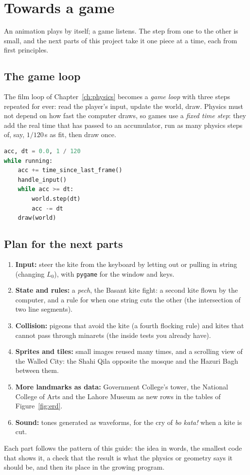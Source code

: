 \chapter{Towards a game}\label{ch:next}

An animation plays by itself; a game listens. The step from one to the other is small, and the next parts of this project take it one piece at a time, each from first principles.

\section{The game loop}
The film loop of Chapter~\ref{ch:physics} becomes a \emph{game loop} with three steps repeated for ever: read the player's input, update the world, draw. Physics must not depend on how fast the computer draws, so games use a \emph{fixed time step}: they add the real time that has passed to an accumulator, run as many physics steps of, say, $1/120$\,s as fit, then draw once.
\begin{lstlisting}[language=Python]
acc, dt = 0.0, 1 / 120
while running:
    acc += time_since_last_frame()
    handle_input()
    while acc >= dt:
        world.step(dt)
        acc -= dt
    draw(world)
\end{lstlisting}

\section{Plan for the next parts}
\begin{enumerate}
\item \textbf{Input:} steer the kite from the keyboard by letting out or pulling in string (changing $L_0$), with \texttt{pygame} for the window and keys.
\item \textbf{State and rules:} a \emph{pech}, the Basant kite fight: a second kite flown by the computer, and a rule for when one string cuts the other (the intersection of two line segments).
\item \textbf{Collision:} pigeons that avoid the kite (a fourth flocking rule) and kites that cannot pass through minarets (the inside tests you already have).
\item \textbf{Sprites and tiles:} small images reused many times, and a scrolling view of the Walled City: the Shahi Qila opposite the mosque and the Hazuri Bagh between them.
\item \textbf{More landmarks as data:} Government College's tower, the National College of Arts and the Lahore Museum as new rows in the tables of Figure~\ref{fig:erd}.
\item \textbf{Sound:} tones generated as waveforms, for the cry of \emph{bo kata!} when a kite is cut.
\end{enumerate}
Each part follows the pattern of this guide: the idea in words, the smallest code that shows it, a check that the result is what the physics or geometry says it should be, and then its place in the growing program.
